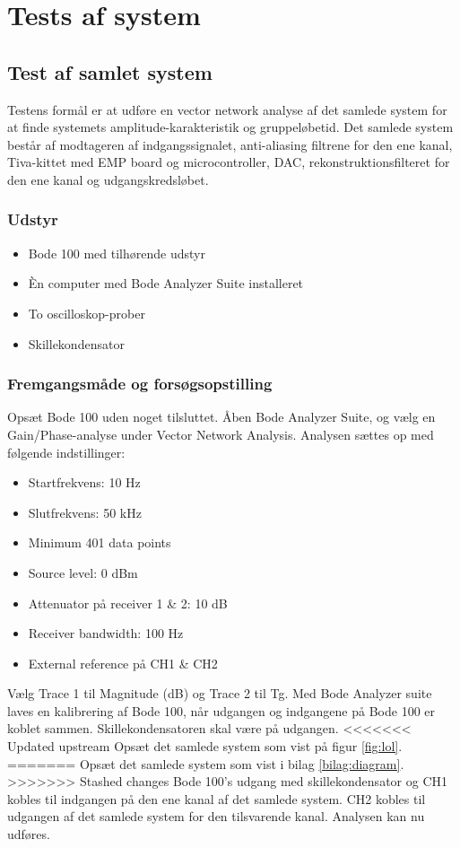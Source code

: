 \chapter{Tests af system}
\label{bilag:test}
\section{Test af samlet system}
\label{sec:test_samlet}
Testens formål er at udføre en vector network analyse af det samlede system for at finde systemets amplitude-karakteristik og gruppeløbetid. 
Det samlede system består af modtageren af indgangssignalet, anti-aliasing filtrene for den ene kanal, Tiva-kittet med EMP board og microcontroller, DAC, rekonstruktionsfilteret for den ene kanal og udgangskredsløbet. 

\subsection{Udstyr}
\begin{itemize}
	\item Bode 100 med tilhørende udstyr
	\item Èn computer med Bode Analyzer Suite installeret
	\item To oscilloskop-prober
	\item Skillekondensator
\end{itemize}

\subsection{Fremgangsmåde og forsøgsopstilling}
Opsæt Bode 100 uden noget tilsluttet. 
Åben Bode Analyzer Suite, og vælg en Gain/Phase-analyse under Vector Network Analysis. 
Analysen sættes op med følgende indstillinger:
\begin{multicols}{2}
\begin{itemize}
	\item Startfrekvens: 10 Hz
	\item Slutfrekvens: 50 kHz
	\item Minimum 401 data points
	\item Source level: 0 dBm
	\item Attenuator på receiver 1 \& 2: 10 dB
	\item Receiver bandwidth: 100 Hz
	\item External reference på CH1 \& CH2
\end{itemize}
\end{multicols}
Vælg Trace 1 til Magnitude (dB) og Trace 2 til Tg. \newline
Med Bode Analyzer suite laves en kalibrering af Bode 100, når udgangen og indgangene på Bode 100 er koblet sammen. 
Skillekondensatoren skal være på udgangen. \newline
<<<<<<< Updated upstream
Opsæt det samlede system som vist på figur \ref{fig:lol}. 
=======
Opsæt det samlede system som vist i bilag \ref{bilag:diagram}. 
>>>>>>> Stashed changes
Bode 100's udgang med skillekondensator og CH1 kobles til indgangen på den ene kanal af det samlede system. 
CH2 kobles til udgangen af det samlede system for den tilsvarende kanal. 
Analysen kan nu udføres. 

